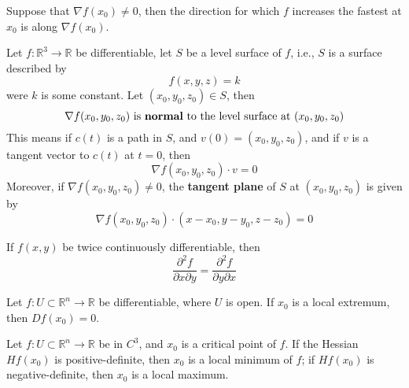 \documentclass[openany]{book}
\newcommand{\R}{\mathbb{R}}
\begin{document}
\begin{prop}
    Suppose that $\nabla f(x_0)\neq 0$, then the direction for which $f$ increases the fastest at $x_0$ is along $\nabla f(x_0)$.
\end{prop}


\begin{prop}\label{tangent plane}
    Let $f:\R^3\to\R$ be differentiable, let $S$ be a level surface of $f$, i.e., $S$ is a surface described by 
    \begin{equation*}
        f(x,y,z)=k
    \end{equation*}
    were $k$ is some constant. Let $(x_0,y_0,z_0)\in S$, then
    \begin{equation*}
        \nabla f(x_0,y_0,z_0) \text{ is \textbf{normal} to the level surface at } (x_0,y_0,z_0)
    \end{equation*}
    This means if $c(t)$ is a path in $S$, and $v(0)=(x_0,y_0,z_0)$, and if $v$ is a tangent vector to $c(t)$ at $t=0$, then 
    \begin{equation*}
        \nabla f(x_0,y_0, z_0)\cdot v=0
    \end{equation*}
    Moreover, if $\nabla f(x_0,y_0,z_0)\neq 0$, the \textbf{tangent plane} of $S$ at $(x_0,y_0,z_0)$ is given by 
    \begin{equation*}
        \nabla f(x_0,y_0,z_0)\cdot (x-x_0, y-y_0, z-z_0)=0
    \end{equation*}
\end{prop}

\begin{prop}
    If $f(x,y)$ be twice continuously differentiable, then 
    \begin{equation*}
        \frac{\partial^2 f}{\partial x\partial y}=\frac{\partial^2f}{\partial y\partial x}
    \end{equation*}
\end{prop}


\begin{prop}
    Let $f:U\subset\R^n\to\R$ be differentiable, where $U$ is open. If $x_0$ is a local extremum, then $Df(x_0)=0$. 
\end{prop}


\begin{prop}[extremum]
    Let $f\colon U\subset\R^n\to\R$ be in $C^3$, and $x_0$ is a critical point of $f$. If the Hessian $Hf(x_0)$ is positive-definite, then $x_0$ is a local minimum of $f$; if $Hf(x_0)$ is negative-definite, then $x_0$ is a local maximum.
\end{prop}
\end{document}

